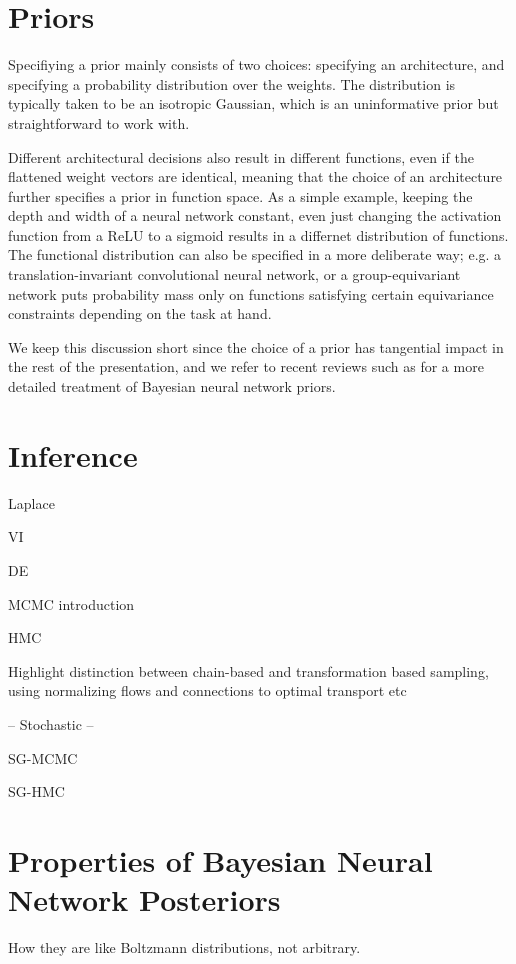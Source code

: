 \section{Priors}

Specifiying a prior mainly consists of two choices: specifying an architecture, and specifying a probability distribution over the weights. The distribution is typically taken to be an isotropic Gaussian, which is an uninformative prior but straightforward to work with. 

Different architectural decisions also result in different functions, even if the flattened weight vectors are identical, meaning that the choice of an architecture further specifies a prior in function space. As a simple example, keeping the depth and width of a neural network constant, even just changing the activation function from a ReLU to a sigmoid results in a differnet distribution of functions. The functional distribution can also be specified in a more deliberate way; e.g. a translation-invariant convolutional neural network, or a group-equivariant network \citep{cohenGroupEquivariantConvolutional2016} puts probability mass only on functions satisfying certain equivariance constraints depending on the task at hand. 

We keep this discussion short since the choice of a prior has tangential impact in the rest of the presentation, and we refer to recent reviews such as \citep{fortuinPriorsBayesianDeep2022} for a more detailed treatment of Bayesian neural network priors. 

\section{Inference} \label{section:bayesian_inference}

Laplace

VI

DE

MCMC introduction

HMC

Highlight distinction between chain-based and transformation based sampling, using normalizing flows and connections to optimal transport etc 

-- Stochastic -- 

SG-MCMC

SG-HMC

\section{Properties of Bayesian Neural Network Posteriors} \label{section:bayesian_properties}

How they are like Boltzmann distributions, not arbitrary. 